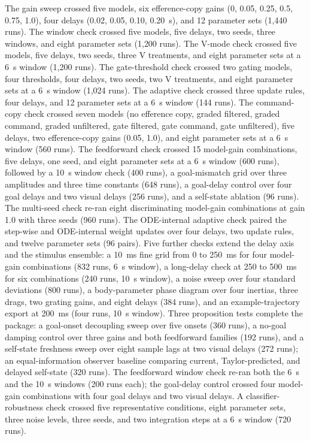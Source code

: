 \documentclass[pdflatex,sn-nature]{sn-jnl}
\begin{document}
The gain sweep crossed five models, six efference-copy gains (0, 0.05, 0.25, 0.5, 0.75, 1.0), four delays (0.02, 0.05, 0.10, 0.20~s), and 12 parameter sets (1{,}440 runs). The window check crossed five models, five delays, two seeds, three windows, and eight parameter sets (1{,}200 runs). The V-mode check crossed five models, five delays, two seeds, three V treatments, and eight parameter sets at a 6~s window (1{,}200 runs). The gate-threshold check crossed two gating models, four thresholds, four delays, two seeds, two V treatments, and eight parameter sets at a 6~s window (1{,}024 runs). The adaptive check crossed three update rules, four delays, and 12 parameter sets at a 6~s window (144 runs). The command-copy check crossed seven models (no efference copy, graded filtered, graded command, graded unfiltered, gate filtered, gate command, gate unfiltered), five delays, two efference-copy gains (0.05, 1.0), and eight parameter sets at a 6~s window (560 runs). The feedforward check crossed 15 model-gain combinations, five delays, one seed, and eight parameter sets at a 6~s window (600 runs), followed by a 10~s window check (400 runs), a goal-mismatch grid over three amplitudes and three time constants (648 runs), a goal-delay control over four goal delays and two visual delays (256 runs), and a self-state ablation (96 runs). The multi-seed check re-ran eight discriminating model-gain combinations at gain 1.0 with three seeds (960 runs). The ODE-internal adaptive check paired the step-wise and ODE-internal weight updates over four delays, two update rules, and twelve parameter sets (96 pairs). Five further checks extend the delay axis and the stimulus ensemble: a 10~ms fine grid from 0 to 250~ms for four model-gain combinations (832 runs, 6~s window), a long-delay check at 250 to 500~ms for six combinations (240 runs, 10~s window), a noise sweep over four standard deviations (800 runs), a body-parameter phase diagram over four inertias, three drags, two grating gains, and eight delays (384 runs), and an example-trajectory export at 200~ms (four runs, 10~s window). Three proposition tests complete the package: a goal-onset decoupling sweep over five onsets (360 runs), a no-goal damping control over three gains and both feedforward families (192 runs), and a self-state freshness sweep over eight sample lags at two visual delays (272 runs); an equal-information observer baseline comparing current, Taylor-predicted, and delayed self-state (320 runs). The feedforward window check re-ran both the 6~s and the 10~s windows (200 runs each); the goal-delay control crossed four model-gain combinations with four goal delays and two visual delays. A classifier-robustness check crossed five representative conditions, eight parameter sets, three noise levels, three seeds, and two integration steps at a 6~s window (720 runs).
\end{document}
